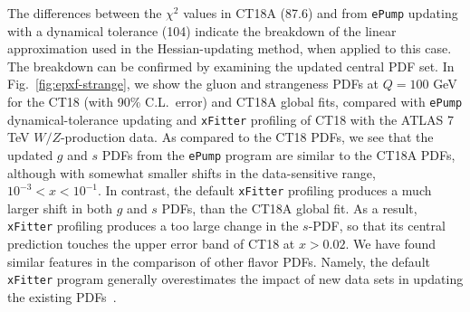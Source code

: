 The differences between the $\chi^2$ values in CT18A (87.6) and from \texttt{ePump} updating with a dynamical tolerance (104) indicate the breakdown of the linear approximation used
in the Hessian-updating method, when applied to this case. The breakdown can be confirmed by examining the updated central PDF set. In Fig.~\ref{fig:epxf-strange}, we show the gluon and strangeness
PDFs at $Q=100$ GeV for the CT18 (with 90\% C.L.~error) and CT18A global fits, compared with \texttt{ePump} dynamical-tolerance updating and \texttt{xFitter} profiling of CT18 with the ATLAS 7 TeV $W/Z$-production data.
%
%
As compared to the CT18 PDFs, we see that the updated $g$ and $s$ PDFs from the \texttt{ePump} program are similar to the CT18A PDFs, although with somewhat smaller shifts in the data-sensitive range, $10^{-3}\! <\! x\! <\! 10^{-1}$. In contrast, the default \texttt{xFitter} profiling produces a much larger shift in both $g$ and $s$ PDFs, than the
CT18A global fit.  As a result, \texttt{xFitter} profiling produces a too large change in the $s$-PDF, so that its central prediction touches the upper error band of CT18 at $x\! >\! 0.02$. 
We have found similar features in the comparison of other flavor PDFs. Namely, the default \texttt{xFitter} program generally overestimates the impact of new data sets in updating the
existing PDFs~\cite{Hou:2019gfw}. 

